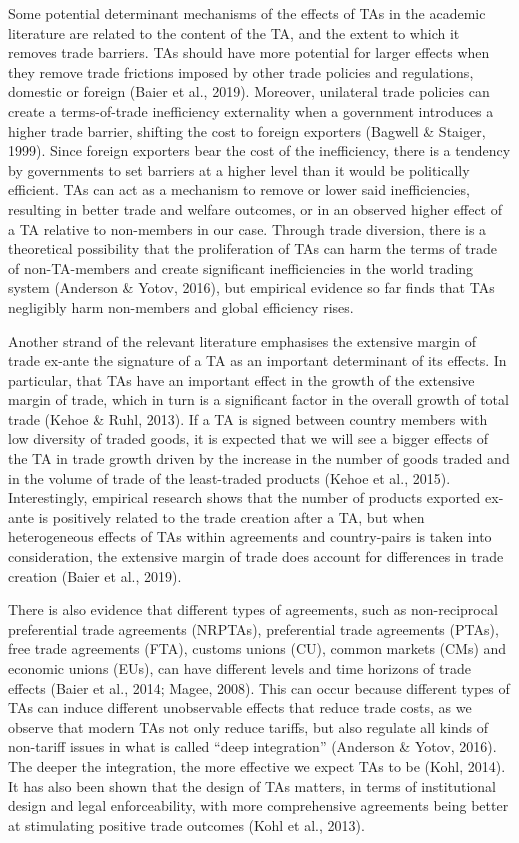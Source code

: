 Some potential determinant mechanisms of the effects of TAs in the
academic literature are related to the content of the TA, and the extent
to which it removes trade barriers. TAs should have more potential for
larger effects when they remove trade frictions imposed by other trade
policies and regulations, domestic or foreign (Baier et al., 2019).
Moreover, unilateral trade policies can create a terms-of-trade
inefficiency externality when a government introduces a higher trade
barrier, shifting the cost to foreign exporters (Bagwell \& Staiger,
1999). Since foreign exporters bear the cost of the inefficiency, there
is a tendency by governments to set barriers at a higher level than it
would be politically efficient. TAs can act as a mechanism to remove or
lower said inefficiencies, resulting in better trade and welfare
outcomes, or in an observed higher effect of a TA relative to
non-members in our case. Through trade diversion, there is a theoretical
possibility that the proliferation of TAs can harm the terms of trade of
non-TA-members and create significant inefficiencies in the world
trading system (Anderson \& Yotov, 2016), but empirical evidence so far
finds that TAs negligibly harm non-members and global efficiency rises.

Another strand of the relevant literature emphasises the extensive
margin of trade ex-ante the signature of a TA as an important
determinant of its effects. In particular, that TAs have an important
effect in the growth of the extensive margin of trade, which in turn is
a significant factor in the overall growth of total trade (Kehoe \&
Ruhl, 2013). If a TA is signed between country members with low
diversity of traded goods, it is expected that we will see a bigger
effects of the TA in trade growth driven by the increase in the number
of goods traded and in the volume of trade of the least-traded products
(Kehoe et al., 2015). Interestingly, empirical research shows that the
number of products exported ex-ante is positively related to the trade
creation after a TA, but when heterogeneous effects of TAs within
agreements and country-pairs is taken into consideration, the extensive
margin of trade does account for differences in trade creation (Baier et
al., 2019).

There is also evidence that different types of agreements, such as
non-reciprocal preferential trade agreements (NRPTAs), preferential
trade agreements (PTAs), free trade agreements (FTA), customs unions
(CU), common markets (CMs) and economic unions (EUs), can have different
levels and time horizons of trade effects (Baier et al., 2014; Magee,
2008). This can occur because different types of TAs can induce
different unobservable effects that reduce trade costs, as we observe
that modern TAs not only reduce tariffs, but also regulate all kinds of
non-tariff issues in what is called ``deep integration'' (Anderson \&
Yotov, 2016). The deeper the integration, the more effective we expect
TAs to be (Kohl, 2014). It has also been shown that the design of TAs
matters, in terms of institutional design and legal enforceability, with
more comprehensive agreements being better at stimulating positive trade
outcomes (Kohl et al., 2013).

